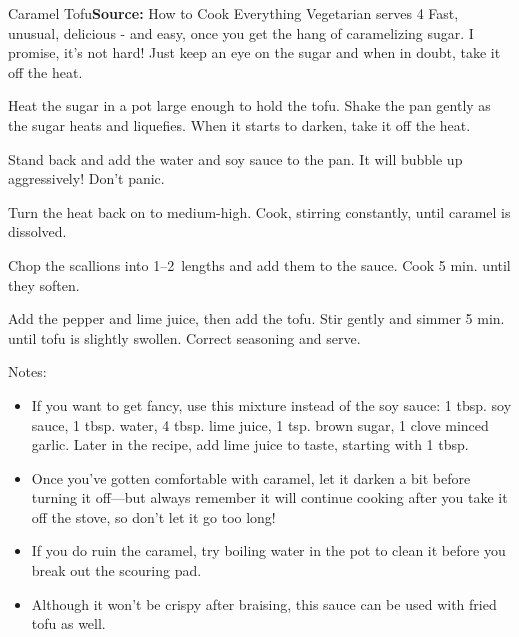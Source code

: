 \begin{recipe}{Caramel Tofu}{}{\textbf{Source:} How to Cook Everything Vegetarian \hfill serves 4}
  \freeform Fast, unusual, delicious - and easy, once you get the hang of caramelizing sugar. I promise, it's not hard! Just keep an eye on the sugar and when in doubt, take it off the heat.

Heat the sugar in a pot large enough to hold the tofu. Shake the pan gently as the sugar heats and liquefies. When it starts to darken, take it off the heat.

Stand back and add the water and soy sauce to the pan. It will bubble up aggressively! Don't panic.

\newstep Turn the heat back on to medium-high. Cook, stirring constantly, until caramel is dissolved.

Chop the scallions into 1--2\inch\ lengths and add them to the sauce. Cook 5 min. until they soften.

Add the pepper and lime juice, then add the tofu. Stir gently and simmer 5 min. until tofu is slightly swollen. Correct seasoning and serve.

\freeform Notes:
\begin{itemize}
  \item If you want to get fancy, use this mixture instead of the soy sauce: 1 tbsp. soy sauce, 1 tbsp. water, 4 tbsp. lime juice, 1 tsp. brown sugar, 1 clove minced garlic. Later in the recipe, add lime juice to taste, starting with 1 tbsp.
  \item Once you've gotten comfortable with caramel, let it darken a bit before turning it off---but always remember it will continue cooking after you take it off the stove, so don't let it go too long!
  \item If you do ruin the caramel, try boiling water in the pot to clean it before you break out the scouring pad.
  \item Although it won't be crispy after braising, this sauce can be used with fried tofu as well.
\end{itemize}
\end{recipe}
